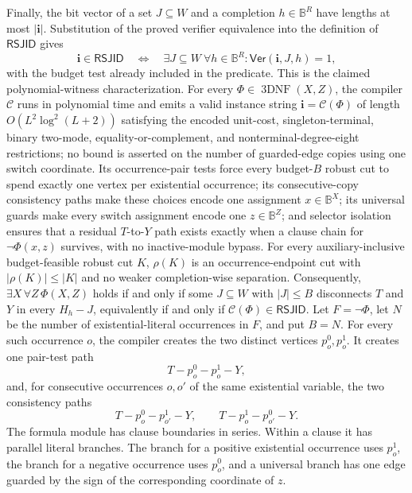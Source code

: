 Finally, the bit vector of a set \(J\subseteq W\) and a completion \(h\in\mathbb B^R\) have lengths at most \(|\mathbf i|\).  Substitution of the proved verifier equivalence into the definition of \(\mathsf{RSJID}\) gives
\[
 \mathbf i\in\mathsf{RSJID}
 \quad\Longleftrightarrow\quad
 \exists J\subseteq W\ \forall h\in\mathbb B^R:
 \mathsf{Ver}(\mathbf i,J,h)=1,
\]
with the budget test already included in the predicate.  This is the claimed polynomial-witness characterization.
For every \(\Phi\in\operatorname{3DNF}(X,Z)\), the compiler \(\mathcal C\) runs in polynomial time and emits a valid instance string \(\mathbf i=\mathcal C(\Phi)\) of length \(O(L^2\log^2(L+2))\) satisfying the encoded unit-cost, singleton-terminal, binary two-mode, equality-or-complement, and nonterminal-degree-eight restrictions; no bound is asserted on the number of guarded-edge copies using one switch coordinate. Its occurrence-pair tests force every budget-\(B\) robust cut to spend exactly one vertex per existential occurrence; its consecutive-copy consistency paths make these choices encode one assignment \(x\in\mathbb B^X\); its universal guards make every switch assignment encode one \(z\in\mathbb B^Z\); and selector isolation ensures that a residual \(T\)-to-\(Y\) path exists exactly when a clause chain for \(\neg\Phi(x,z)\) survives, with no inactive-module bypass. For every auxiliary-inclusive budget-feasible robust cut \(K\), \(\rho(K)\) is an occurrence-endpoint cut with \(|\rho(K)|\le |K|\) and no weaker completion-wise separation. Consequently, \(\exists X\,\forall Z\,\Phi(X,Z)\) holds if and only if some \(J\subseteq W\) with \(|J|\le B\) disconnects \(T\) and \(Y\) in every \(H_h-J\), equivalently if and only if \(\mathcal C(\Phi)\in\mathsf{RSJID}\).
Let \(F=\neg\Phi\), let \(N\) be the number of existential-literal occurrences in \(F\), and put \(B=N\).  For every such occurrence \(o\), the compiler creates the two distinct vertices \(p_o^0,p_o^1\).  It creates one pair-test path
\[
 T-p_o^0-p_o^1-Y,
\]
and, for consecutive occurrences \(o,o'\) of the same existential variable, the two consistency paths
\[
 T-p_o^0-p_{o'}^1-Y,
 \qquad
 T-p_o^1-p_{o'}^0-Y.
\]
The formula module has clause boundaries in series.  Within a clause it has parallel literal branches.  The branch for a positive existential occurrence uses \(p_o^1\), the branch for a negative occurrence uses \(p_o^0\), and a universal branch has one edge guarded by the sign of the corresponding coordinate of \(z\).

